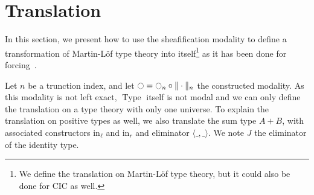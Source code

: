 \documentclass[preprint,9pt,numbers]{sigplanconf}
\DeclareMathOperator{\Type}{Type}
\newcommand{\modal}{\ensuremath{\ocircle}}
\begin{document}
\section{Translation}
\label{sec:translation}

In this section, we present how to use the sheafification modality to
define a transformation of Martin-Löf type theory into
itself\footnote{We define the translation on Martin-Löf type theory,
  but it could also be done for CIC as well.} as it has been done for
forcing~\cite{jaber2012extending}.

Let $n$ be a trunction index, and let $\modal = \modal_n \circ
\|\cdot\|_n$ the constructed modality. 
%
As this modality is not left exact, $\Type$ itself is not modal and we
can only define the translation on a type theory with only one
universe.
%
To explain the translation on positive types as well, we also
translate the sum type $A+B$, with associated constructors
$\mathrm{in}_\ell$
and $\mathrm{in}_r$ and eliminator $\langle \_ , \_ \rangle$.
%
We note $J$ the eliminator of the identity type. 
%
%
\end{document}
